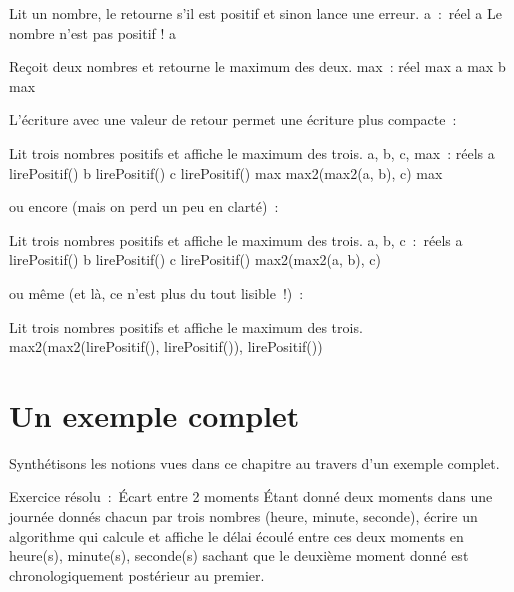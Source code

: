 	\begin{Pseudocode}
	\LComment Lit un nombre, le retourne s’il est positif et sinon lance une erreur.
		\Decl a~:~réel
		\Read a
			\Error Le nombre n’est pas positif !
		\EndIf
		\Return a
	\EndModule
	\end{Pseudocode}

	\begin{Pseudocode}
	\LComment Reçoit deux nombres et retourne le maximum des deux.
	\Module{max2}{a\In, b\In~:~réels}{réel}
		\Decl max~: réel
		\If{a > b}
			\Let max \Gets a
		\Else
			\Let max \Gets b
		\EndIf
		\Return max
	\EndModule
	\end{Pseudocode}

	L’écriture avec une valeur de retour permet une
	écriture plus compacte~:

	\begin{Pseudocode}
	\LComment Lit trois nombres positifs et affiche le maximum des trois.
	\Module{max3}{}{}
		\Decl a, b, c, max~: réels
		\Let a \Gets lirePositif()
		\Let b \Gets lirePositif()
		\Let c \Gets lirePositif()
		\Let max  \Gets max2(max2(a, b), c)
		\Write max
	\EndModule
	\end{Pseudocode}

	ou encore (mais on perd un peu en clarté)~:

	\begin{Pseudocode}
	\LComment Lit trois nombres positifs et affiche le maximum des trois.
	\Module{max3}{}{}
		\Decl a, b, c~:~réels
		\Let a \Gets lirePositif()
		\Let b \Gets lirePositif()
		\Let c \Gets lirePositif()
		\Write max2(max2(a, b), c)
	\EndModule
	\end{Pseudocode}

	ou même (et là, ce n’est plus du tout lisible~!)~:

	\begin{Pseudocode}
	\LComment Lit trois nombres positifs et affiche le maximum des trois.
		\Write max2(max2(lirePositif(), lirePositif()), lirePositif())
	\EndModule
	\end{Pseudocode}

\section{Un exemple complet}

	Synthétisons les notions vues dans ce chapitre au travers
	d’un exemple complet.
	
	\begin{Emphase}[exercice]{Exercice résolu~:~Écart entre 2 moments}
		Étant donné deux moments dans une journée donnés chacun par trois
		nombres (heure, minute, seconde), écrire un algorithme qui calcule et
		affiche le délai écoulé entre ces deux moments en heure(s), minute(s),
		seconde(s) sachant que le deuxième moment donné est chronologiquement
		postérieur au premier.
	\end{Emphase}
	

